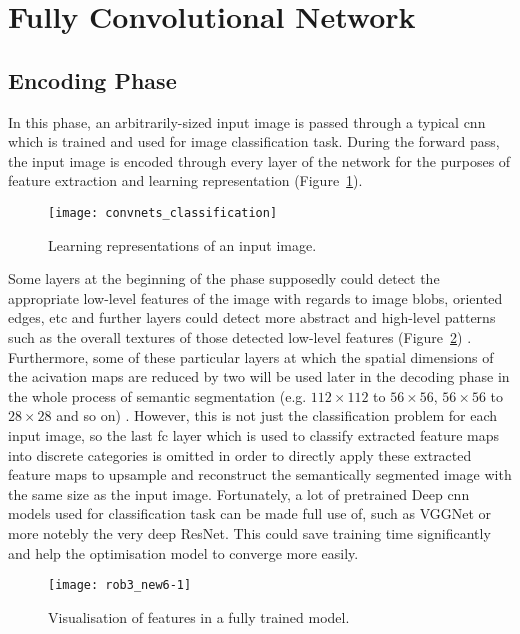 \section{Fully Convolutional Network}
\subsection{Encoding Phase}
In this phase, an arbitrarily-sized input image is passed through a typical
\acrshort{cnn} which is trained and used for image classification task. During
the forward pass, the input image is encoded through every layer of the network
for the purposes of feature extraction and learning representation
(Figure~\ref{fig:encoding}).
\begin{figure}[h]
    \centering
    \texttt{[image: convnets\_classification]}
    \caption{Learning representations of an input image.}
    \label{fig:encoding}
\end{figure}
Some layers at the beginning of the phase
supposedly could detect the appropriate low-level features of the image with
regards to image blobs, oriented edges, etc and further layers could detect more
abstract and high-level patterns such as the overall textures of those detected
low-level features (Figure~\ref{fig:cnn_visualisation})
\cite{DBLP:journals/corr/ZeilerF13}. Furthermore, some of these particular
layers at which the spatial dimensions of the acivation maps are reduced by two
will be used later in the decoding phase in the whole process of semantic
segmentation (e.g. $112 \times 112$ to $56 \times 56$, $56 \times 56$ to $28
\times 28$ and so on) \cite{Long_2015_CVPR}. However, this is not just the
classification problem for each input image, so the last \acrshort{fc} layer
which is used to classify extracted feature maps into discrete categories is
omitted in order to directly apply these extracted feature maps to upsample and
reconstruct the semantically segmented image with the same size as the input
image. Fortunately, a lot of pretrained Deep \acrshort{cnn} models used for
classification task can be made full use of, such as VGGNet or more notebly the
very deep ResNet. This could save training time significantly and help the
optimisation model to converge more easily.
\begin{figure}[h]
    \centering
    \texttt{[image: rob3\_new6-1]}
    \caption{Visualisation of features in a fully trained model.}
    \label{fig:cnn_visualisation}
\end{figure}

